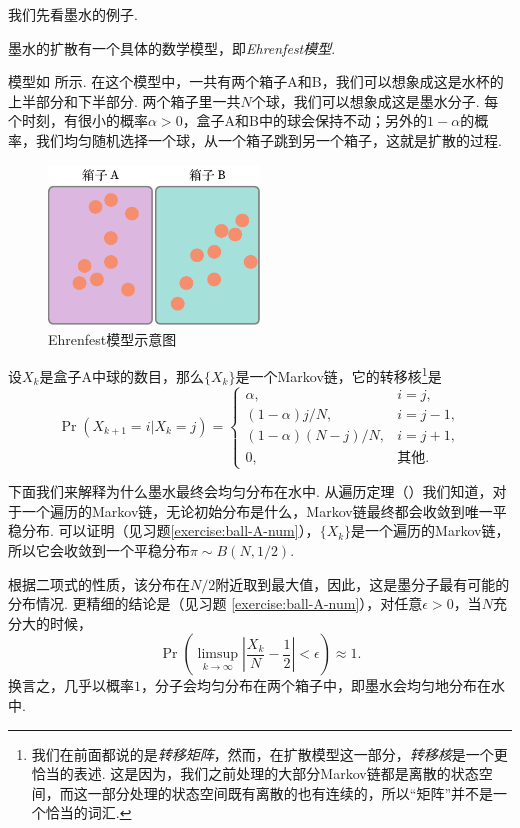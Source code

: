 我们先看墨水的例子. 
\begin{example}[墨水的扩散]\label{ex:ink-diffusion}
墨水的扩散有一个具体的数学模型，即\emph{Ehrenfest模型}. 

模型如 所示. 在这个模型中，一共有两个箱子A和B，我们可以想象成这是水杯的上半部分和下半部分. 两个箱子里一共$N$个球，我们可以想象成这是墨水分子. 每个时刻，有很小的概率$\alpha>0$，盒子A和B中的球会保持不动；另外的$1-\alpha$的概率，我们均匀随机选择一个球，从一个箱子跳到另一个箱子，这就是扩散的过程. 

\begin{figure}[ht]
    \centering
    \includegraphics[width=0.5\textwidth]{figures/Markov-chain/Ehrenfest-model.pdf}
    \caption{Ehrenfest模型示意图}\label{fig:ehrenfest-model}
\end{figure}

设$X_k$是盒子A中球的数目，那么$\{X_k\}$是一个Markov链，它的转移核\footnote{我们在前面都说的是\emph{转移矩阵}，然而，在扩散模型这一部分，\emph{转移核}是一个更恰当的表述. 这是因为，我们之前处理的大部分Markov链都是离散的状态空间，而这一部分处理的状态空间既有离散的也有连续的，所以“矩阵”并不是一个恰当的词汇. }是
\[
    \Pr(X_{k+1}=i|X_k=j) = \begin{cases}
        \alpha, & i = j,\\
        (1-\alpha)j/N, & i = j-1,\\
        (1-\alpha)(N-j)/N, & i = j+1,\\
        0, & \text{其他}.
    \end{cases}
\]

下面我们来解释为什么墨水最终会均匀分布在水中. 从遍历定理（）我们知道，对于一个遍历的Markov链，无论初始分布是什么，Markov链最终都会收敛到唯一平稳分布. 可以证明（见习题\ref{exercise:ball-A-num}），$\{X_k\}$是一个遍历的Markov链，所以它会收敛到一个平稳分布$\pi\sim B(N,1/2)$. 

根据二项式的性质，该分布在$N/2$附近取到最大值，因此，这是墨分子最有可能的分布情况. 更精细的结论是（见习题 \ref{exercise:ball-A-num}），对任意$\epsilon>0$，当$N$充分大的时候，
\[
    \Pr\left(\limsup_{k\to\infty}\left|\frac{X_k}{N}-\frac{1}{2}\right|<\epsilon\right) \approx 1.
\]
换言之，几乎以概率$1$，分子会均匀分布在两个箱子中，即墨水会均匀地分布在水中.
\end{example}

